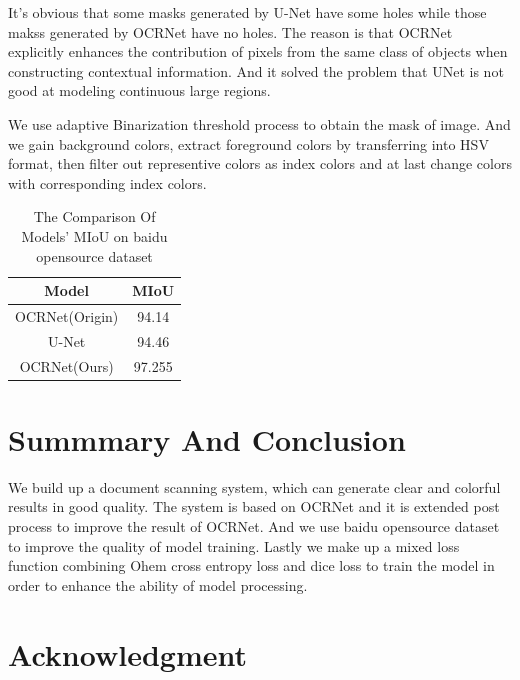 \documentclass[10pt, conference, compsocconf]{IEEEtran}
\begin{document}
	It's obvious that some masks generated by U-Net have some holes while those makss generated by OCRNet have no holes. 
	The reason is that OCRNet explicitly enhances the contribution of pixels from the same class of objects when constructing contextual information. 
	And it solved the problem that UNet is not good at modeling continuous large regions. 

	We use adaptive Binarization threshold process to obtain the mask of image.
	And we gain background colors, extract foreground colors by transferring into HSV format, then filter out representive colors as index colors and at last change colors with corresponding index colors. 
		
	\begin{table}[!h]
		\renewcommand{\arraystretch}{1.3}
		\caption{The Comparison Of Models' MIoU on baidu opensource dataset}
		\centering
		\begin{tabular}{cc} \\
			\hline
			Model & MIoU\\
			\hline
			OCRNet(Origin) & 94.14\\
			\hline
			U-Net & 94.46\\
			\hline
			OCRNet(Ours) & 97.255\\
			\hline
		\end{tabular}
		
	\end{table}
	
	\section{Summmary And Conclusion}

	We build up a document scanning system, which can generate clear and colorful results in good quality. 
	The system is based on OCRNet and it is extended post process to improve the result of OCRNet. 
	And we use baidu opensource dataset to improve the quality of model training. 
	Lastly we make up a mixed loss function combining Ohem cross entropy loss and dice loss to train the model in order to enhance the ability of model processing. 
	
	\section*{Acknowledgment}
	
	
\end{document}
